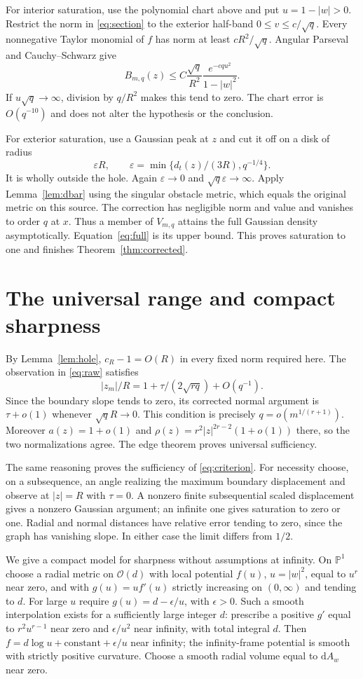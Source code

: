 \documentclass[11pt]{article}
\theoremstyle{remark}\newtheorem{remark}[theorem]{Remark}
\newcommand{\dA}{\mathrm dA}
\newcommand{\CP}{\mathbb P}
\begin{document}
For interior saturation, use the polynomial chart above and put
$u=1-|w|>0$. Restrict the norm in \eqref{eq:section} to the exterior
half-band $0\leq v\leq c/\sqrt q$. Every nonnegative Taylor monomial
of $f$ has norm at least $cR^2/\sqrt q$. Angular Parseval and
Cauchy--Schwarz give
\[
 B_{m,q}(z)\leq
 C\frac{\sqrt q}{R^2}\frac{e^{-cqu^2}}{1-|w|^2}.
\]
If $u\sqrt q\to\infty$, division by $q/R^2$ makes this tend to zero.
The chart error is $O(q^{-10})$ and does not alter the hypothesis or
the conclusion.

For exterior saturation, use a Gaussian peak at $z$ and cut it off on
a disk of radius
\[
 \varepsilon R,\qquad
 \varepsilon=\min\{d_t(z)/(3R),q^{-1/4}\}.
\]
It is wholly outside the hole. Again $\varepsilon\to0$ and
$\sqrt q\varepsilon\to\infty$. Apply Lemma~\ref{lem:dbar} using the
singular obstacle metric, which equals the original metric on this
source. The correction has negligible norm and value and vanishes to
order $q$ at $x$. Thus a member of $V_{m,q}$ attains the full Gaussian
density asymptotically. Equation~\eqref{eq:full} is its upper bound.
This proves saturation to one and finishes Theorem~\ref{thm:corrected}.

\section{The universal range and compact sharpness}
By Lemma~\ref{lem:hole}, $c_R-1=O(R)$ in every fixed norm required
here. The observation in \eqref{eq:raw} satisfies
\[
 |z_m|/R=1+\tau/(2\sqrt{rq})+O(q^{-1}).
\]
Since the boundary slope tends to zero, its corrected normal argument
is $\tau+o(1)$ whenever $\sqrt q R\to0$. This condition is precisely
$q=o(m^{1/(r+1)})$. Moreover $a(z)=1+o(1)$ and
$\rho(z)=r^2|z|^{2r-2}(1+o(1))$ there, so the two normalizations agree.
The edge theorem proves universal sufficiency.

The same reasoning proves the sufficiency of \eqref{eq:criterion}.
For necessity choose, on a subsequence, an angle realizing the maximum
boundary displacement and observe at $|z|=R$ with $\tau=0$. A nonzero
finite subsequential scaled displacement gives a nonzero Gaussian
argument; an infinite one gives saturation to zero or one. Radial and
normal distances have relative error tending to zero, since the graph
has vanishing slope. In either case the limit differs from $1/2$.

We give a compact model for sharpness without assumptions at infinity.
On $\CP^1$ choose a radial metric on $\mathcal O(d)$ with local potential
$f(u)$, $u=|w|^2$, equal to $u^r$ near zero, and with
$g(u)=uf'(u)$ strictly increasing on $(0,\infty)$ and tending to $d$.
For large $u$ require $g(u)=d-\epsilon/u$, with $\epsilon>0$.
Such a smooth interpolation exists for a sufficiently large integer
$d$: prescribe a positive $g'$ equal to $r^2u^{r-1}$ near zero and
$\epsilon/u^2$ near infinity, with total integral $d$.
Then $f=d\log u+\mathrm{constant}+\epsilon/u$ near infinity; the
infinity-frame potential is smooth with strictly positive curvature.
Choose a smooth radial volume equal to $\dA_w$ near zero.
\end{document}
